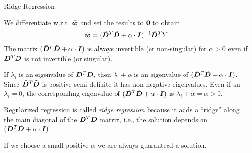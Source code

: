 \begin{frame}{Ridge Regression}

%

We differentiate w.r.t. $\tilde{{\boldsymbol w}}$ and set the results to
$\mathbf{0}$ to obtain
\begin{align*}
   \tilde{{\boldsymbol w}} = (\tilde{{\boldsymbol D}}^T\tilde{{\boldsymbol D}} + \alpha\cdot{\boldsymbol I})^{-1} \tilde{{\boldsymbol D}}^T Y
\end{align*}
The matrix $(\tilde{{\boldsymbol D}}^T\tilde{{\boldsymbol D}} + \alpha\cdot{\boldsymbol I})$ is always invertible (or
non-singular) for
$\alpha >
0$ even if $\tilde{{\boldsymbol D}}^T\tilde{{\boldsymbol D}}$ is not invertible (or singular). 

\medskip

If
$\lambda_i$ is an eigenvalue of $\tilde{{\boldsymbol D}}^T\tilde{{\boldsymbol D}}$, then $\lambda_i + \alpha$ is an
eigenvalue of $(\tilde{{\boldsymbol D}}^T\tilde{{\boldsymbol D}} + \alpha\cdot{\boldsymbol I})$. Since $\tilde{{\boldsymbol D}}^T\tilde{{\boldsymbol D}}$ is positive
semi-definite it has non-negative eigenvalues. 
Even if an $\lambda_i = 0$, the
corresponding eigenvalue of $(\tilde{{\boldsymbol D}}^T\tilde{{\boldsymbol D}} + \alpha\cdot {\boldsymbol I})$ is
$\lambda_i+\alpha = \alpha > 0$. 
\medskip

Regularized regression is called
{\em ridge regression} because it
adds a ``ridge'' along the main diagonal of the $\tilde{{\boldsymbol D}}^T\tilde{{\boldsymbol D}}$ matrix, i.e.,
the solution depends on $(\tilde{{\boldsymbol D}}^T\tilde{{\boldsymbol D}} +
\alpha\cdot{\boldsymbol I})$. 

\medskip

If we
choose a small positive $\alpha$ we are always guaranteed a solution.

\end{frame}
